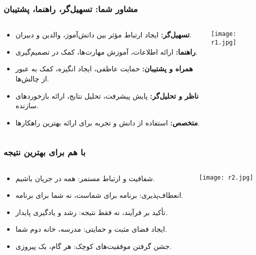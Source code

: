\documentclass[aspectratio=169]{beamer}
\begin{document}
\begin{frame}[fragile]
  \frametitle{مشاور شما: تسهیل‌گر، راهنما، پشتیبان}

  \begin{columns}[T]
    \begin{column}{0.55\textwidth}
      \begin{itemize}\setlength{\itemsep}{3pt}\setlength{\parsep}{2pt}
        \item \textbf{تسهیل‌گر:} ایجاد ارتباط مؤثر بین دانش‌آموز، والدین و دبیران.
        \item \textbf{راهنما:} ارائه اطلاعات، آموزش مهارت‌ها، کمک در تصمیم‌گیری.
        \item \textbf{همراه و پشتیبان:} حمایت عاطفی، ایجاد انگیزه، کمک به عبور از چالش‌ها.
        \item \textbf{ناظر و تحلیل‌گر:} پایش پیشرفت، تحلیل نتایج، ارائه بازخوردهای سازنده.
        \item \textbf{متخصص:} استفاده از دانش و تجربه برای ارائه بهترین راهکارها.
      \end{itemize}
    \end{column}

    \begin{column}{0.4\textwidth}
      \texttt{[image: r1.jpg]}
    \end{column}
  \end{columns}
\end{frame}

\begin{frame}[fragile]
  \frametitle{با هم برای بهترین نتیجه}

  \begin{columns}[T]
    \begin{column}{0.55\textwidth}
      \begin{itemize}\setlength{\itemsep}{3pt}\setlength{\parsep}{2pt}
        \item شفافیت و ارتباط مستمر: همه در جریان باشیم.
        \item انعطاف‌پذیری: برنامه برای شماست، نه شما برای برنامه.
        \item تأکید بر فرآیند، نه فقط نتیجه: رشد و یادگیری پایدار.
        \item ایجاد فضای مثبت و حمایتی: مدرسه، خانه دوم شما.
        \item جشن گرفتن موفقیت‌های کوچک: هر گام، یک پیروزی.
      \end{itemize}
    \end{column}

    \begin{column}{0.4\textwidth}
      \texttt{[image: r2.jpg]}
    \end{column}
  \end{columns}
\end{frame}
\end{document}
